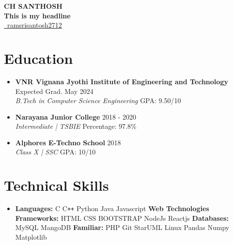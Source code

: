 \documentclass[letterpaper,5pt]{article}
\begin{document}
    \begin{center}
      \textbf{\Huge \scshape CH SANTHOSH} \\ \vspace{5pt}
      \textbf{\large This is my headline} \\ \vspace{2pt}
      \href{mailto:ramsrisantosh2712}{\raisebox{-0.05\height}\faEnvelope \ ramsrisantosh2712} 
       \
       \
       \
    \end{center}

    
    \section{Education}
    \begin{itemize}
        \item
            \textbf{VNR Vignana Jyothi Institute of Engineering and Technology} \hfill Expected Grad. May 2024 \\
            \textit{B.Tech in Computer Science Engineering} \hfill GPA: 9.50/10
          \vspace*{-2mm}  
        \item
            \textbf{Narayana Junior College} \hfill 2018 - 2020 \\
            \textit{Intermediate | TSBIE} \hfill Percentage: 97.8\%
            \vspace*{-2mm}  
        \item
            \textbf{Alphores E-Techno School} \hfill 2018 \\
            \textit{Class X | SSC} \hfill GPA: 10/10
    \end{itemize}
    \vspace*{-6mm}  
    
    
    \section{Technical Skills}
        \begin{itemize}[leftmargin=0.15in,label={}]
          \item{
            \textbf{Languages: }{C \textbullet{} C\texttt{++} \textbullet{} Python \textbullet{} Java \textbullet{} Javascript \newline}
            \textbf{Web Technologies Frameworks: }{HTML  \textbullet CSS \textbullet{} BOOTSTRAP \textbullet{} NodeJs \textbullet{} Reactjs \newline}
            \textbf{Databases: }{MySQL \textbullet{} MangoDB \newline}
            \textbf{Familiar: }{PHP \textbullet{} Git \textbullet{} StarUML \textbullet{} Linux \textbullet{} Pandas \textbullet{} Numpy \textbullet{} Matplotlib } 
            
          }
          
        \end{itemize}
        \vspace*{-6mm}  
    
\end{document}
